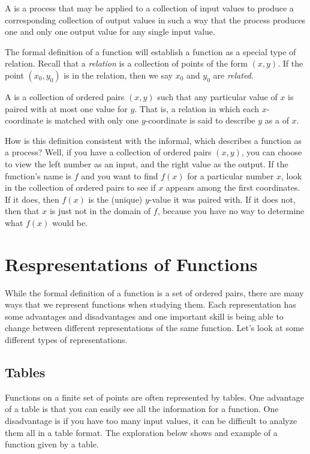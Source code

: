 \documentclass{ximera}
\begin{document}
\begin{definition}
A  is a process that may be applied to a collection of input values to produce a corresponding collection of output values in such a way that the process produces one and only one output value for any single input value.
\end{definition}

The formal definition of a function will establish a function as a special type of relation.  Recall that a \emph{relation} is a collection of points of the form $(x,y)$.  If the point $(x_0,y_0)$ is in the relation, then we say $x_0$ and $y_0$ are \emph{related}.

\begin{definition}
A  is a collection of ordered pairs $(x,y)$ such that any particular value of $x$ is paired with at most one value for $y$. That is, a relation in which each $x$-coordinate is matched with only one $y$-coordinate is said to describe $y$ as a  of $x$.
\end{definition}

How is this definition consistent with the informal, which describes a function as a process? Well, if you have a collection of ordered pairs $(x,y)$, you can choose to view the left number as an input, and the right value as the output. If the function's name is $f$ and you want to find $f(x)$  for a particular number $x$, look in the collection of ordered pairs to see if $x$ appears among the first coordinates. If it does, then $f(x)$ is the (unique) $y$-value it was paired with. If it does not, then that $x$ is just not in the domain of $f$, because you have no way to determine what $f(x)$ would be.

\section{Respresentations of Functions}
While the formal definition of a function is a set of ordered pairs, there are many ways that we represent functions when studying them.  Each representation has some advantages and disadvantages and one important skill is being able to change between different representations of the same function.  Let's look at some different types of representations.

\subsection{Tables}
Functions on a finite set of points are often represented by tables.  One advantage of a table is that you can easily see all the information for a function.  One disadvantage is if you have too many input values, it can be difficult to analyze them all in a table format.  The exploration below shows and example of a function given by a table.
\end{document}

